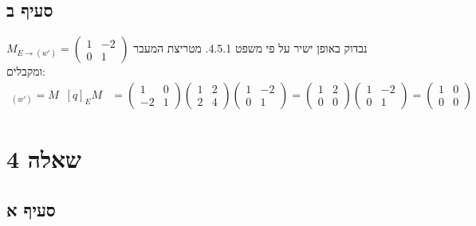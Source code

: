 \documentclass{article}
\DeclareMathOperator{\tra}{^t}
\begin{document}
\subsection*{סעיף ב}

נבדוק באופן ישיר על פי משפט 4.5.1. מטריצת המעבר $M_{E\rightarrow (w')}=\begin{pmatrix}
        1 & -2 \\
        0 & 1
    \end{pmatrix}$ ומקבלים:
\begin{align*}
    [q]_{(w')}=M\tra [q]_E M & =\begin{pmatrix}
                                    1  & 0 \\
                                    -2 & 1
                                \end{pmatrix} \begin{pmatrix}
                                                  1 & 2 \\
                                                  2 & 4
                                              \end{pmatrix} \begin{pmatrix}
                                                                1 & -2 \\
                                                                0 & 1
                                                            \end{pmatrix}
    = \begin{pmatrix}
          1 & 2 \\
          0 & 0
      \end{pmatrix}\begin{pmatrix}
                       1 & -2 \\
                       0 & 1
                   \end{pmatrix}=\begin{pmatrix}
                                     1 & 0 \\
                                     0 & 0
                                 \end{pmatrix}
\end{align*}
\pagebreak

\section*{שאלה 4}

\subsection*{סעיף א}
\end{document}
